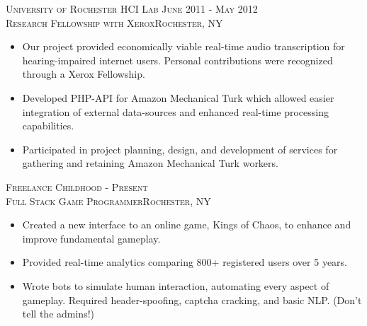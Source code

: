 \documentclass[oneside, final]{scrartcl}
\begin{document}
\begin{center}
\textsc{University of Rochester HCI Lab \hfill June 2011 - May 2012\\}
\textsc{Research Fellowship with Xerox\hfill Rochester, NY\\}
\begin{itemize}
  \vspace{-8pt}
  \setlength{\itemsep}{1pt}
  \setlength{\parskip}{0pt}
  \setlength{\parsep}{0pt}
  \setlength{\leftmargin}{-5mm}
  \item Our project provided economically viable real-time audio transcription for hearing-impaired internet users. Personal contributions were recognized through a Xerox Fellowship.
  \item Developed PHP-API for Amazon Mechanical Turk which allowed easier integration of external data-sources and enhanced real-time processing capabilities.
  \item Participated in project planning, design, and development of services for gathering and retaining Amazon Mechanical Turk workers.
\end{itemize}



\textsc{Freelance \hfill  Childhood - Present\\}
\textsc{Full Stack Game Programmer\hfill Rochester, NY\\}
\begin{itemize}
    \vspace{-8pt}
	\setlength{\itemsep}{1pt}
	\setlength{\parskip}{0pt}
	\setlength{\parsep}{0pt}
	\setlength{\leftmargin}{-5mm}
	\item Created a new interface to an online game, Kings of Chaos, to enhance and improve fundamental gameplay.
	\item Provided real-time analytics comparing 800+ registered users over 5 years.
	\item Wrote bots to simulate human interaction, automating every aspect of gameplay. Required header-spoofing, captcha cracking, and basic NLP. (Don't tell the admins!)
\end{itemize}

\clearpage


 \begin{comment}

\textsc{Intellisites \hfill Summer 2009, 2010\\}
\textsc{Web Developer\hfill Albany, NY\\}
\begin{itemize}
	\setlength{\itemsep}{1pt}
	\setlength{\parskip}{0pt}
	\setlength{\parsep}{0pt}
	\setlength{\leftmargin}{-5mm}
	\item Performed security audits on legacy websites for OWASP Top-10 vulnerabilities including SQL injection, Cross-site Scripting and configuration problems.
	\item Wrote file management application with granular user access control and permissions. Application allowed productivity increases in client office.
\end{itemize}


\end{comment}
\end{center}
\end{document}
